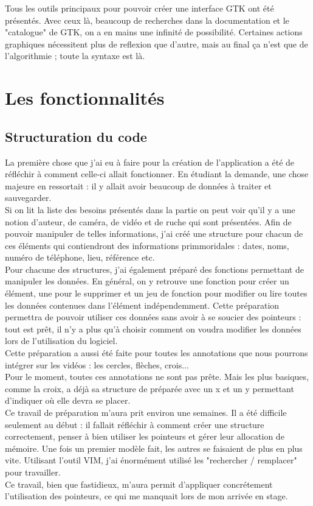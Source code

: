 \documentclass[11pt,french,a4paper]{report}
\begin{document}
Tous les outils principaux pour pouvoir créer une interface GTK ont été présentés. Avec ceux là, beaucoup de recherches
dans la documentation et le "catalogue" %
de GTK, on a en mains une infinité de possibilité. Certaines actions graphiques nécessitent plus de reflexion que d'autre, mais 
au final ça n'est que de l'algorithmie ; toute la syntaxe est là. \\

    \section{Les fonctionnalités} 
        \subsection{Structuration du code}
La première chose que j'ai eu à faire pour la création de l'application a été de réfléchir à comment celle-ci allait fonctionner.
En étudiant la demande, une chose majeure en ressortait : il y allait avoir beaucoup de données à traiter et sauvegarder. \\
Si on lit la liste des besoins présentés dans la partie %
on peut voir qu'il y a une notion d'auteur, de caméra, de vidéo et de ruche qui sont présentées. Afin de pouvoir manipuler de telles informations, 
j'ai créé une structure pour chacun de ces éléments qui contiendront des informations primmoridales : dates, noms, numéro de téléphone, lieu, 
référence etc. \\
Pour chacune des structures, j'ai également préparé des fonctions permettant de manipuler les données. En général, on y retrouve 
une fonction pour créer un élément, une pour le supprimer et un jeu de fonction pour modifier ou lire toutes les données contenues dans l'élément
indépendemment. Cette préparation permettra de pouvoir utiliser ces données sans avoir à se soucier des pointeurs : tout est prêt, il n'y
a plus qu'à choisir comment on voudra modifier les données lors de l'utilisation du logiciel. \\
Cette préparation a aussi été faite pour toutes les annotations que nous pourrons intégrer sur les vidéos : les cercles, flèches, crois... \\
Pour le moment, toutes ces annotations ne sont pas prête. Mais les plus basiques, comme la croix, a déjà sa structure de préparée avec un x et un y 
permettant d'indiquer où elle devra se placer. \\
Ce travail de préparation m'aura prit environ une semaines. Il a été difficile seulement au début : il fallait réfléchir 
à comment créer une structure correctement, penser à bien utiliser les pointeurs et gérer leur allocation de
mémoire. Une fois un premier modèle fait, les autres se faisaient de plus en plus vite. Utilisant l'outil VIM, j'ai 
énormément utilisé les "rechercher / remplacer" pour travailler. \\
Ce travail, bien que fastidieux, m'aura permit d'appliquer concrétement l'utilisation des pointeurs, ce qui 
me manquait lors de mon arrivée en stage. \\ 
\end{document}

